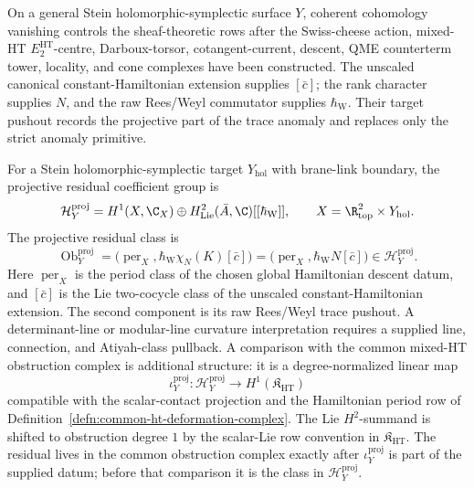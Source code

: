 On a general Stein holomorphic-symplectic surface \(Y\), coherent
cohomology vanishing controls the sheaf-theoretic rows after the
Swiss-cheese action, mixed-HT \(E_2^{\mathrm{HT}}\)-centre,
Darboux-torsor, cotangent-current, descent, QME counterterm tower,
locality, and cone
complexes have been constructed.  The unscaled canonical
constant-Hamiltonian extension supplies \([\bar c]\); the rank character
supplies \(N\), and the raw Rees/Weyl commutator supplies
\(\hbar_{\mathrm W}\).  Their target pushout records the projective part
of the trace anomaly and replaces only the strict anomaly primitive.

\begin{defn}
\label{defn:projective-stein-residual-class}
For a Stein holomorphic-symplectic target \(Y_{\mathrm{hol}}\) with
brane-link boundary, the projective residual coefficient group is
\[
  \mathcal H^{\mathrm{proj}}_Y
  =
  H^1(X,\C_X)
  \oplus
  H^2_{\mathrm{Lie}}(\bar A,\C)[[\hbar_{\mathrm{W}}]],
  \qquad
  X=\R^2_{\mathrm{top}}\times Y_{\mathrm{hol}} .
\]
The projective residual class is
\[
  \operatorname{Ob}^{\mathrm{proj}}_Y
  =
  \bigl(\operatorname{per}_X,
  \hbar_{\mathrm{W}}\chi_N(K)[\bar c]\bigr)
  =\bigl(\operatorname{per}_X,\hbar_{\mathrm{W}}N[\bar c]\bigr)
  \in \mathcal H^{\mathrm{proj}}_Y .
\]
Here \(\operatorname{per}_X\) is the period class of the chosen global
Hamiltonian descent datum, and \([\bar c]\) is the Lie two-cocycle class
of the unscaled constant-Hamiltonian extension.  The second component is
its raw Rees/Weyl trace pushout.  A determinant-line or modular-line
curvature interpretation requires a supplied line, connection, and
Atiyah-class pullback.  A comparison with the common
mixed-HT obstruction complex is additional structure: it is a
degree-normalized linear map
\[
  \iota^{\mathrm{proj}}_Y\colon
  \mathcal H^{\mathrm{proj}}_Y
  \longrightarrow H^1(\mathfrak K_{\mathrm{HT}})
\]
compatible with the scalar-contact projection and the Hamiltonian
period row of Definition~\ref{defn:common-ht-deformation-complex}.  The
Lie \(H^2\)-summand is shifted to obstruction degree \(1\) by the
scalar-Lie row convention in \(\mathfrak K_{\mathrm{HT}}\).  The residual
lives in the common obstruction complex exactly after
\(\iota^{\mathrm{proj}}_Y\) is part of the supplied datum; before that
comparison it is the class in \(\mathcal H^{\mathrm{proj}}_Y\).
\end{defn}

